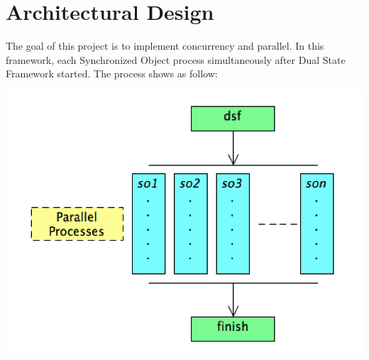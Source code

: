 \hypertarget{_framework_design_FrameworkDesignArchitectureDesign}{}\section{Architectural Design}\label{_framework_design_FrameworkDesignArchitectureDesign}
The goal of this project is to implement concurrency and parallel. In this framework, each Synchronized Object process simultaneously after Dual State Framework started. The process shows as follow\+: 
\begin{DoxyImageNoCaption}
  \mbox{\includegraphics[width=\textwidth,height=\textheight/2,keepaspectratio=true]{DesignArchitecture.png}}
\end{DoxyImageNoCaption}


